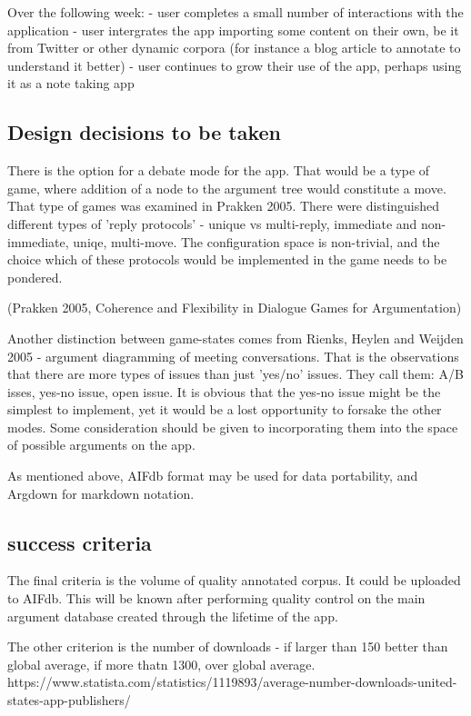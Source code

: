 \documentclass{article}
\begin{document}
Over the following week:
- user completes a small number of interactions with the application
- user intergrates the app importing some content on their own, be it from Twitter or other dynamic corpora (for instance a blog article to annotate to understand it better)
- user continues to grow their use of the app, perhaps using it as a note taking app

\subsection{Design decisions to be taken}
There is the option for a debate mode for the app.
That would be a type of game, where addition of a node to the argument tree would constitute a move.
That type of games was examined in Prakken 2005.
There were distinguished different types of 'reply protocols' - unique vs multi-reply, immediate and non-immediate, uniqe, multi-move.
The configuration space is non-trivial, and the choice which of these protocols would be implemented in the game needs to be pondered.

(Prakken 2005, Coherence and Flexibility in Dialogue Games for Argumentation)

Another distinction between game-states comes from Rienks, Heylen and Weijden 2005 - argument diagramming of meeting conversations.
That is the observations that there are more types of issues than just 'yes/no' issues.
They call them: A/B isses, yes-no issue, open issue.
It is obvious that the yes-no issue might be the simplest to implement, yet it would be a lost opportunity to forsake the other modes.
Some consideration should be given to incorporating them into the space of possible arguments on the app.

As mentioned above, AIFdb format may be used for data portability, and Argdown for markdown notation.

\subsection{success criteria}
The final criteria is the volume of quality annotated corpus. It could be uploaded to AIFdb. 
This will be known after performing quality control on the main argument database created through the lifetime of the app. 

The other criterion is the number of downloads - if larger than 150 better than global average, if more thatn 1300, over global average.
https://www.statista.com/statistics/1119893/average-number-downloads-united-states-app-publishers/
\end{document}
